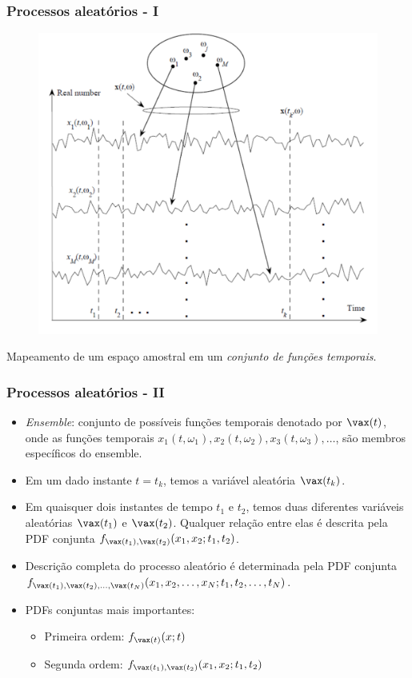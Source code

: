 \begin{frame}
    \frametitle{Processos aleatórios - I}

    \begin{figure}[t]
	  \begin{center}
	    \includegraphics[width=0.5\columnwidth]{figs/fig22}
	  \end{center}
	\end{figure}
     Mapeamento de um espaço amostral em um \textit{conjunto de funções temporais}. 
\end{frame}

\begin{frame}
    \frametitle{Processos aleatórios - II}

    \begin{itemize}
     \item \textit{Ensemble}: conjunto de possíveis funções temporais denotado por $\vax(t)$, onde as funções temporais $x_1(t,\omega_1), x_2(t,\omega_2), x_3(t,\omega_3), \ldots$, são membros específicos do ensemble.
      \item Em um dado instante $t=t_k$, temos a variável aleatória $\vax(t_k)$.
      \item Em quaisquer dois instantes de tempo $t_1$ e $t_2$, temos duas diferentes variáveis aleatórias $\vax(t_1)$ e $\vax(t_2)$. Qualquer relação entre elas é descrita pela PDF conjunta $f_{\vax(t_1),\vax(t_2)}(x_1,x_2;t_1,t_2)$.
      \item Descrição completa do processo aleatório é determinada pela PDF conjunta $f_{\vax(t_1),\vax(t_2),\ldots,\vax(t_N)}(x_1,x_2,\ldots,x_N;t_1,t_2,\ldots,t_N)$.
      \item PDFs conjuntas mais importantes:
      \begin{itemize}
       \item Primeira ordem: $f_{\vax(t)}(x;t)$
	\item Segunda ordem: $f_{\vax(t_1),\vax(t_2)}(x_1,x_2;t_1,t_2)$
      \end{itemize}

    \end{itemize}

\end{frame}

